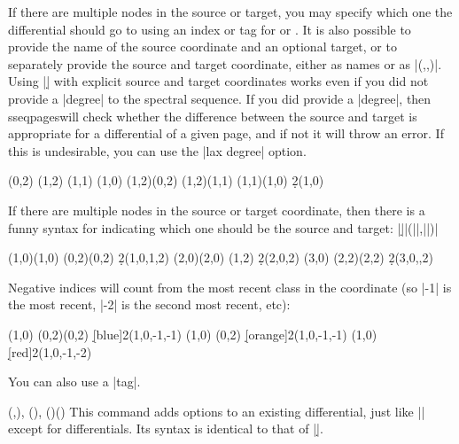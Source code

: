 \documentclass{ltxdoc}
\def\sseqpages{sseqpages}
\begin{document}
\begin{sseqdata}[name=ex1,degree={#1}{1-#1}]
\begin{commandlist}
If there are multiple nodes in the source or target, you may specify which one the differential should go to using an index or tag for  or . It is also possible to provide the name of the source coordinate and an optional target, or to separately provide the source and target coordinate, either as names or as |(,,)|. Using |\d| with explicit source and target coordinates works even if you did not provide a |degree| to the spectral sequence. If you did provide a |degree|, then \sseqpages\space will check whether the difference between the source and target is appropriate for a differential of a given page, and if not it will throw an error. If this is undesirable, you can use the |lax degree| option.
\begin{codeexample}[width=7.5cm]
\begin{sseqdata}[name=d example,degree={-1}{#1},
                 struct lines=blue]
\class(0,2)
\class(1,2)
\class(1,1)
\class(1,0)
\structline(1,2)(0,2)
\structline(1,2)(1,1)
\structline(1,1)(1,0)
\d2(1,0)
\end{sseqdata}
\printpage[name=d example,page=2]
\hskip0.3cm
\printpage[name=d example,page=3]
\end{codeexample}
If there are multiple nodes in the source or target coordinate, then there is a funny syntax for indicating which one should be the source and target:
|\d||(||,||)|
\begin{codeexample}[width=7.5cm]
\begin{sseqpage}
\class(1,0)\class(1,0)
\class(0,2)\class(0,2)
\d2(1,0,1,2)
\class(2,0)\class(2,0)
\class(1,2)
\d2(2,0,2)
\class(3,0)
\class(2,2)\class(2,2)
\d2(3,0,,2)
\end{sseqpage}
\end{codeexample}
Negative indices will count from the most recent class in the coordinate (so |-1| is the most recent, |-2| is the second most recent, etc):
\begin{codeexample}[width=7.5cm]
\begin{sseqpage}
\class(1,0)
\class(0,2)\class(0,2)
\d[blue]2(1,0,-1,-1)
\class(1,0)
\class(0,2)
\d[orange]2(1,0,-1,-1)
\class(1,0)
\d[red]2(1,0,-1,-2)
\end{sseqpage}
\end{codeexample}
You can also use a |tag|.
\end{commandlist}

\begin{commandlist}{
    {(,)},
    {()},
    {()()}%
}
This command adds options to an existing differential, just like |\classoptions| except for differentials. Its syntax is identical to that of |\d|.
\end{commandlist}


\end{sseqdata}
\end{document}
